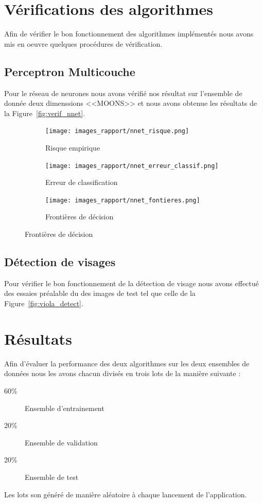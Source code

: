 \documentclass[a4paper,10pt,twocolumn]{extarticle}
\begin{document}
\section{Vérifications des algorithmes}
Afin de vérifier le bon fonctionnement des algorithmes implémentés nous avons mis en oeuvre quelques procédures de vérification.

\subsection{Perceptron Multicouche}
Pour le réseau de neurones nous avons vérifié nos résultat sur l'ensemble de donnée deux dimenssions <<MOONS>> et nous avons obtenue les résultats de la Figure~\ref{fig:verif_nnet}.
\begin{figure}[H]
        \centering
        \caption{Vérification du réseau de neurones}\label{fig:verif_nnet}
        \begin{subfigure}[b]{220pt}
                \centering
                \caption{Risque empirique}
                \texttt{[image: images\_rapport/nnet\_risque.png]}
        \end{subfigure}
        \begin{subfigure}[b]{220pt}
                \centering
                \caption{Erreur de classification}
                \texttt{[image: images\_rapport/nnet\_erreur\_classif.png]}
        \end{subfigure}
        \begin{subfigure}[b]{220pt}
                \centering
                \caption{Frontières de décision}
                \texttt{[image: images\_rapport/nnet\_fontieres.png]}
        \end{subfigure}
\end{figure}

\subsection{Détection de visages}
Pour vérifier le bon fonctionnement de la détection de visage nous avons effectué des essaies préalable du des images de test tel que celle de la Figure~\ref{fig:viola_detect}.

\section{Résultats}
Afin d'évaluer la performance des deux algorithmes sur les deux ensembles de données nous les avons chacun divisés en trois lots de la manière suivante :
\begin{description}
  \item[60\%] Ensemble d'entrainement
  \item[20\%] Ensemble de validation
  \item[20\%] Ensemble de test
\end{description}
Les lots son généré de manière aléatoire à chaque lancement de l'application.
\end{document}
